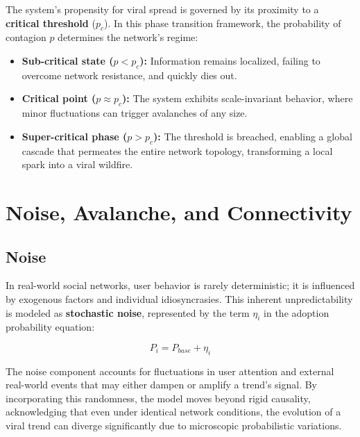 \documentclass[12pt]{article}
\begin{document}
The system’s propensity for viral spread is governed by its proximity to a \textbf{critical threshold} ($p_c$). In this phase transition framework, the probability of contagion $p$ determines the network's regime:

\begin{itemize}
    \item \textbf{Sub-critical state ($p < p_c$):} Information remains localized, failing to overcome network resistance, and quickly dies out.
    \item \textbf{Critical point ($p \approx p_c$):} The system exhibits scale-invariant behavior, where minor fluctuations can trigger avalanches of any size.
    \item \textbf{Super-critical phase ($p > p_c$):} The threshold is breached, enabling a global cascade that permeates the entire network topology, transforming a local spark into a viral wildfire.
\end{itemize}

\vfill %

\section{\Large Noise, Avalanche, and Connectivity}


\subsection{Noise}

In real-world social networks, user behavior is rarely deterministic; it is influenced by exogenous factors and individual idiosyncrasies. This inherent unpredictability is modeled as \textbf{stochastic noise}, represented by the term $\eta_i$ in the adoption probability equation:

\begin{equation}
P_i = P_{base} + \eta_i
\end{equation}

\vspace{0.8cm} %

The noise component accounts for fluctuations in user attention and external real-world events that may either dampen or amplify a trend's signal. By incorporating this randomness, the model moves beyond rigid causality, acknowledging that even under identical network conditions, the evolution of a viral trend can diverge significantly due to microscopic probabilistic variations. 
\end{document}
